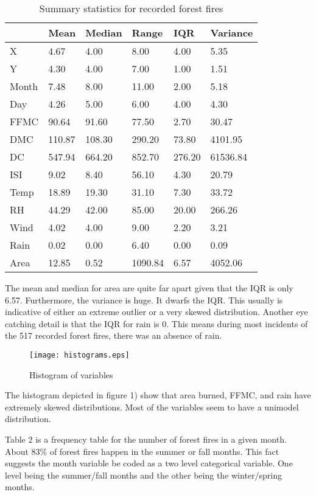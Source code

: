 \documentclass[11pt]{report}
\begin{document}
\begin{table}[!htb]
\begin{center}
    \begin{tabular}{llllll}
    \hline
		   & Mean & Median & Range & IQR & Variance \\ \hline
X&   4.67&   4.00 &   8.00&   4.00&     5.35 \\
Y&  4.30&   4.00 &   7.00&   1.00 &    1.51 \\
Month&   7.48&   8.00&   11.00 &  2.00&     5.18 \\
Day&   4.26&   5.00 &   6.00  & 4.00 &    4.30 \\
FFMC&  90.64&  91.60&   77.50 &  2.70&    30.47 \\
DMC& 110.87& 108.30 & 290.20 & 73.80&  4101.95 \\
DC& 547.94& 664.20  &852.70& 276.20& 61536.84 \\
ISI&   9.02&   8.40  & 56.10 &  4.30  &  20.79 \\
Temp&  18.89&  19.30 &  31.10 &  7.30 &   33.72 \\
RH&  44.29 & 42.00  & 85.00 & 20.00  & 266.26 \\
Wind&   4.02&   4.00 &   9.00 &  2.20 &    3.21 \\
Rain&   0.02 &  0.00 &   6.40 &  0.00 &    0.09 \\
Area&  12.85 &  0.52& 1090.84 &  6.57 & 4052.06		 \\ \hline   
    \end{tabular}
		\caption {Summary statistics for recorded forest fires}
\end{center}
\end{table}
\noindent The mean and median for area are quite far apart given that the IQR is only 6.57. Furthermore, the variance is huge. It dwarfs the IQR. This usually is indicative of either an extreme outlier or a very skewed distribution. Another eye catching detail is that the IQR for rain is 0. This means during most incidents of the 517 recorded forest fires, there was an absence of rain.


\begin{figure}[!htb]
\centering
\texttt{[image: histograms.eps]}
\caption{Histogram of variables}
\end{figure}

\noindent The histogram depicted in figure 1) show that area burned, FFMC, and rain have extremely skewed distributions. Most of the variables seem to have a unimodel distribution.

Table 2 is a frequency table for the number of forest fires in a given month. About 83\% of forest fires happen in the summer or fall months. This fact suggests the month variable be coded as a two level categorical variable. One level being the summer/fall months and the other being the winter/spring months.
\end{document}
